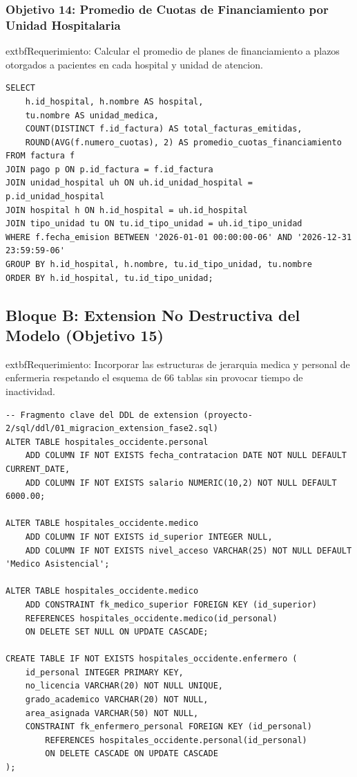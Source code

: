 \documentclass[11pt,a4paper]{article}
\begin{document}
\subsubsection{Objetivo 14: Promedio de Cuotas de Financiamiento por Unidad Hospitalaria}
	extbf{Requerimiento:} Calcular el promedio de planes de financiamiento a plazos otorgados a pacientes en cada hospital y unidad de atencion.
\begin{lstlisting}[style=sqlstyle]
SELECT 
    h.id_hospital, h.nombre AS hospital,
    tu.nombre AS unidad_medica,
    COUNT(DISTINCT f.id_factura) AS total_facturas_emitidas,
    ROUND(AVG(f.numero_cuotas), 2) AS promedio_cuotas_financiamiento
FROM factura f
JOIN pago p ON p.id_factura = f.id_factura
JOIN unidad_hospital uh ON uh.id_unidad_hospital = p.id_unidad_hospital
JOIN hospital h ON h.id_hospital = uh.id_hospital
JOIN tipo_unidad tu ON tu.id_tipo_unidad = uh.id_tipo_unidad
WHERE f.fecha_emision BETWEEN '2026-01-01 00:00:00-06' AND '2026-12-31 23:59:59-06'
GROUP BY h.id_hospital, h.nombre, tu.id_tipo_unidad, tu.nombre
ORDER BY h.id_hospital, tu.id_tipo_unidad;
\end{lstlisting}

\subsection{Bloque B: Extension No Destructiva del Modelo (Objetivo 15)}
	extbf{Requerimiento:} Incorporar las estructuras de jerarquia medica y personal de enfermeria respetando el esquema de 66 tablas sin provocar tiempo de inactividad.
\begin{lstlisting}[style=sqlstyle]
-- Fragmento clave del DDL de extension (proyecto-2/sql/ddl/01_migracion_extension_fase2.sql)
ALTER TABLE hospitales_occidente.personal
    ADD COLUMN IF NOT EXISTS fecha_contratacion DATE NOT NULL DEFAULT CURRENT_DATE,
    ADD COLUMN IF NOT EXISTS salario NUMERIC(10,2) NOT NULL DEFAULT 6000.00;

ALTER TABLE hospitales_occidente.medico
    ADD COLUMN IF NOT EXISTS id_superior INTEGER NULL,
    ADD COLUMN IF NOT EXISTS nivel_acceso VARCHAR(25) NOT NULL DEFAULT 'Medico Asistencial';

ALTER TABLE hospitales_occidente.medico
    ADD CONSTRAINT fk_medico_superior FOREIGN KEY (id_superior)
    REFERENCES hospitales_occidente.medico(id_personal)
    ON DELETE SET NULL ON UPDATE CASCADE;

CREATE TABLE IF NOT EXISTS hospitales_occidente.enfermero (
    id_personal INTEGER PRIMARY KEY,
    no_licencia VARCHAR(20) NOT NULL UNIQUE,
    grado_academico VARCHAR(20) NOT NULL,
    area_asignada VARCHAR(50) NOT NULL,
    CONSTRAINT fk_enfermero_personal FOREIGN KEY (id_personal)
        REFERENCES hospitales_occidente.personal(id_personal)
        ON DELETE CASCADE ON UPDATE CASCADE
);
\end{lstlisting}
\end{document}
